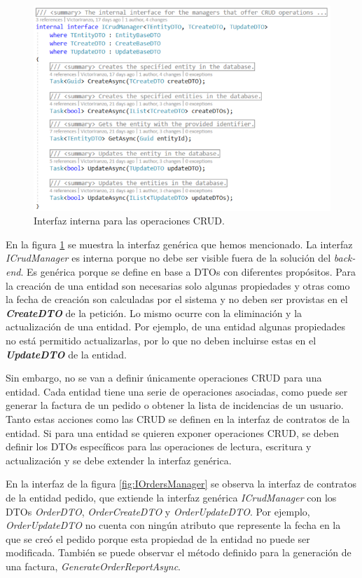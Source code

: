 \documentclass[11pt,spanish,listoffigures]{tfgetsinf}
\begin{document}
\begin{figure}[h]
\centering
\includegraphics[scale=0.8]{ICrudManager}
\caption{Interfaz interna para las operaciones CRUD.}
\label{fig:ICrudManager}
\end{figure}

En la figura \ref{fig:ICrudManager} se muestra la interfaz genérica que hemos mencionado. La interfaz \textit{ICrudManager} es interna porque no debe ser visible fuera de la solución del \textit{back-end}. Es genérica porque se define en base a DTOs con diferentes propósitos. Para la creación de una entidad son necesarias solo algunas propiedades y otras como la fecha de creación son calculadas por el sistema y no deben ser provistas en el \textbf{\textit{CreateDTO}} de la petición. Lo mismo ocurre con la eliminación y la actualización de una entidad. Por ejemplo, de una entidad algunas propiedades no está permitido actualizarlas, por lo que no deben incluirse estas en el \textbf{\textit{UpdateDTO}} de la entidad. 

Sin embargo, no se van a definir únicamente operaciones CRUD para una entidad. Cada entidad tiene una serie de operaciones asociadas, como puede ser generar la factura de un pedido o obtener la lista de incidencias de un usuario. Tanto estas acciones como las CRUD se definen en la interfaz de contratos de la entidad. Si para una entidad se quieren exponer operaciones CRUD, se deben definir los DTOs específicos para las operaciones de lectura, escritura y actualización y se debe extender la interfaz genérica. 

En la interfaz de la figura \ref{fig:IOrdersManager} se observa la interfaz de contratos de la entidad pedido, que extiende la interfaz genérica \textit{ICrudManager} con los DTOs \textit{OrderDTO}, \textit{OrderCreateDTO} y \textit{OrderUpdateDTO}. Por ejemplo, \textit{OrderUpdateDTO} no cuenta con ningún atributo que represente la fecha en la que se creó el pedido porque esta propiedad de la entidad no puede ser modificada. También se puede observar el método definido para la generación de una factura, \textit{GenerateOrderReportAsync}.
\end{document}
